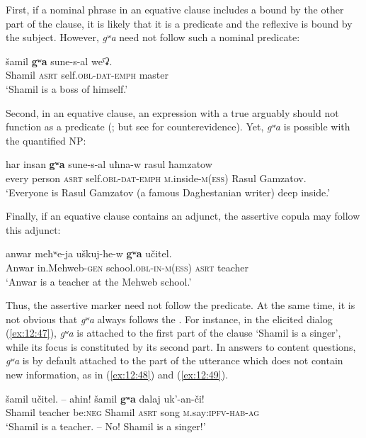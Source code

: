 ﻿\documentclass[output=paper]{langsci/langscibook}
\begin{document}
First, if a nominal phrase in an equative clause includes a 
bound by the other part of the clause, it is likely that it is a
predicate and the reflexive is bound by the subject. However, \emph{gʷa}
need not follow such a nominal predicate:

\ea \label{ex:12:44} %
\gll šamil \textbf{gʷa} sune-s-al weˤʡ.\\
Shamil \textsc{asrt} self.\textsc{obl}-\textsc{dat}-\textsc{emph} master\\
\glt `Shamil is a boss of himself.'
\z

Second, in an equative clause, an expression with a true  arguably should not function as a predicate (\citealt{partee1987}; but
see \citealt{arkadiev-lander2013} for counterevidence). Yet, \emph{gʷa} is
possible with the quantified NP:

\ea \label{ex:12:45} %
\gll har insan \textbf{gʷa} sune-s-al uħna-w rasul ħamzatow\\
every person \textsc{asrt} self.\textsc{obl}-\textsc{dat}-\textsc{emph} \textsc{m}.inside-\textsc{m}(\textsc{ess}) Rasul Gamzatov.\\
\glt `Everyone is Rasul Gamzatov (a famous Daghestanian writer) deep inside.'
\z

Finally, if an equative clause contains an adjunct, the assertive copula
may follow this adjunct:

\ea \label{ex:12:46} %
\gll anwar meħʷe-ja uškuj-ħe-w \textbf{gʷa} učitel.\\
Anwar in.Mehweb-\textsc{gen} school.\textsc{obl}-\textsc{in}-\textsc{m}(\textsc{ess}) \textsc{asrt} teacher\\
\glt `Anwar is a teacher at the Mehweb school.'
\z

Thus, the assertive marker need not follow the predicate. At the same
time, it is not obvious that \emph{gʷa} always follows the . For
instance, in the elicited dialog (\ref{ex:12:47}), \emph{gʷa} is attached to the
first part of the clause `Shamil is a singer', while its focus is
constituted by its second part. In answers to content questions,
\emph{gʷa} is by default attached to the part of the utterance which
does not contain new information, as in (\ref{ex:12:48}) and (\ref{ex:12:49}).

\ea \label{ex:12:47} %
\gll šamil učitel. – aħin! šamil \textbf{gʷa} dalaj uk'-an-či!\\
Shamil teacher {} {be}:\textsc{neg} Shamil \textsc{asrt} song \textsc{m}.say:\textsc{ipfv}-\textsc{hab}-\textsc{ag}\\
\glt `Shamil is a teacher. – No! Shamil is a singer!'
\end{document}
